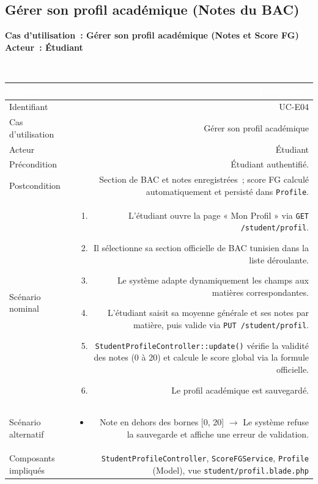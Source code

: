 \documentclass[a4paper,12pt]{article}
\newcommand{\ucheader}[2]{%
  \noindent\colorbox{capblue}{\parbox{\dimexpr\linewidth-2\fboxsep}{%
    \color{white}\bfseries\large Cas d'utilisation~: #1 \hfill \normalsize Acteur~: #2
  }}\\[2pt]
}
\begin{document}
\vspace{1em}

\subsection{Gérer son profil académique (Notes du BAC)}
\ucheader{Gérer son profil académique (Notes et Score FG)}{Étudiant}

\noindent
\begin{tabular}{|L|R|}
\hline
{}\textcolor{white}{\textbf{Champ}} & \textcolor{white}{\textbf{Description}} \\
\hline
{}Identifiant & UC-E04 \\
\hline
Cas d'utilisation & Gérer son profil académique \\
\hline
{}Acteur & Étudiant \\
\hline
Précondition & Étudiant authentifié. \\
\hline
{}Postcondition & Section de BAC et notes enregistrées~; score FG calculé automatiquement et persisté dans \texttt{Profile}. \\
\hline
Scénario nominal &
\begin{enumerate}
  \item L'étudiant ouvre la page « Mon Profil » via \texttt{GET /student/profil}.
  \item Il sélectionne sa section officielle de BAC tunisien dans la liste déroulante.
  \item Le système adapte dynamiquement les champs aux matières correspondantes.
  \item L'étudiant saisit sa moyenne générale et ses notes par matière, puis valide via \texttt{PUT /student/profil}.
  \item \texttt{StudentProfileController::update()} vérifie la validité des notes (0 à 20) et calcule le score global via la formule officielle.
  \item Le profil académique est sauvegardé.
\end{enumerate} \\
\hline
{}Scénario alternatif &
\begin{itemize}
  \item Note en dehors des bornes [0, 20] $\rightarrow$ Le système refuse la sauvegarde et affiche une erreur de validation.
\end{itemize} \\
\hline
Composants impliqués & \texttt{StudentProfileController}, \texttt{ScoreFGService}, \texttt{Profile} (Model), vue \texttt{student/profil.blade.php} \\
\hline
\end{tabular}
\end{document}
